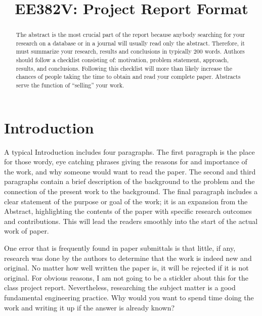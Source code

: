 \documentclass[conference]{IEEEtran}
\begin{document}
\title{EE382V: Project Report Format}

\author{
\and
{}
\and
{}
}

\maketitle

\begin{abstract}

The abstract is the most crucial part of the report because anybody searching for your research on a database or in a journal will usually read only the abstract. Therefore, it must summarize your research, results and conclusions in typically 200 words.  Authors should follow a checklist consisting of: motivation, problem statement, approach, results, and conclusions. Following this checklist will more than likely increase the chances of people taking the time to obtain and read your complete paper. Abstracts serve the function of ``selling'' your work.

\end{abstract}

\section{Introduction}

A typical Introduction includes four paragraphs. The first paragraph is the place for those wordy, eye catching phrases giving the reasons for and importance of the work, and why someone would want to read the paper. The second and third paragraphs contain a brief description of the background to the problem and the connection of the present work to the background. The final paragraph includes a clear statement of the purpose or goal of the work; it is an expansion from the Abstract, highlighting the contents of the paper with specific research outcomes and contributions. This will lead the readers smoothly into the start of the actual work of paper.

One error that is frequently found in paper submittals is that little, if any, research was done by the authors to determine that the work is indeed new and original. No matter how well written the paper is, it will be rejected if it is not original. For obvious reasons, I am not going to be a stickler about this for the class project report. ­Nevertheless, researching the subject matter is a good fundamental engineering practice. Why would you want to spend time doing the work and writing it up if the answer is already known?
\end{document}
